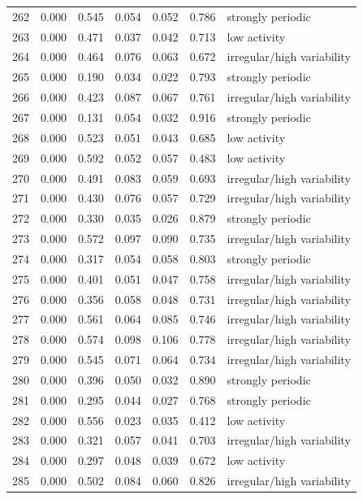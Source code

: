 \begin{longtable}{lrrrrrl}
262 & 0.000 & 0.545 & 0.054 & 0.052 & 0.786 & strongly periodic \\
263 & 0.000 & 0.471 & 0.037 & 0.042 & 0.713 & low activity \\
264 & 0.000 & 0.464 & 0.076 & 0.063 & 0.672 & irregular/high variability \\
265 & 0.000 & 0.190 & 0.034 & 0.022 & 0.793 & strongly periodic \\
266 & 0.000 & 0.423 & 0.087 & 0.067 & 0.761 & irregular/high variability \\
267 & 0.000 & 0.131 & 0.054 & 0.032 & 0.916 & strongly periodic \\
268 & 0.000 & 0.523 & 0.051 & 0.043 & 0.685 & low activity \\
269 & 0.000 & 0.592 & 0.052 & 0.057 & 0.483 & low activity \\
270 & 0.000 & 0.491 & 0.083 & 0.059 & 0.693 & irregular/high variability \\
271 & 0.000 & 0.430 & 0.076 & 0.057 & 0.729 & irregular/high variability \\
272 & 0.000 & 0.330 & 0.035 & 0.026 & 0.879 & strongly periodic \\
273 & 0.000 & 0.572 & 0.097 & 0.090 & 0.735 & irregular/high variability \\
274 & 0.000 & 0.317 & 0.054 & 0.058 & 0.803 & strongly periodic \\
275 & 0.000 & 0.401 & 0.051 & 0.047 & 0.758 & irregular/high variability \\
276 & 0.000 & 0.356 & 0.058 & 0.048 & 0.731 & irregular/high variability \\
277 & 0.000 & 0.561 & 0.064 & 0.085 & 0.746 & irregular/high variability \\
278 & 0.000 & 0.574 & 0.098 & 0.106 & 0.778 & irregular/high variability \\
279 & 0.000 & 0.545 & 0.071 & 0.064 & 0.734 & irregular/high variability \\
280 & 0.000 & 0.396 & 0.050 & 0.032 & 0.890 & strongly periodic \\
281 & 0.000 & 0.295 & 0.044 & 0.027 & 0.768 & strongly periodic \\
282 & 0.000 & 0.556 & 0.023 & 0.035 & 0.412 & low activity \\
283 & 0.000 & 0.321 & 0.057 & 0.041 & 0.703 & irregular/high variability \\
284 & 0.000 & 0.297 & 0.048 & 0.039 & 0.672 & low activity \\
285 & 0.000 & 0.502 & 0.084 & 0.060 & 0.826 & irregular/high variability \\

\end{longtable}
